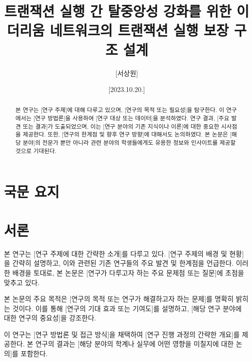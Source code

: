 \documentclass[a4paper,11pt]{article}
\title{트랜잭션 실행 간 탈중앙성 강화를 위한 이더리움 네트워크의 트랜잭션 실행 보장 구조 설계}
\author{[서상원]}
\date{[2023.10.20.]}
\begin{document}



\newpage 
{} %

\setcounter{page}{1}
\tableofcontents

\newpage
\clearpage %
\section*{\centering 국문 요지} %

\begin{abstract}
    본 연구는 [연구 주제]에 대해 다루고 있으며, [연구의 목적 또는 필요성]을 탐구한다. 
    이 연구에서는 [연구 방법론]을 사용하여 [연구 대상 또는 데이터]을 분석하였다. 
    연구 결과, [주요 발견 또는 결과]가 도출되었으며, 이는 [연구 분야의 기존 지식이나 이론]에 대한 중요한 시사점을 제공한다. 
    또한, [연구의 한계점 및 향후 연구 방향]에 대해서도 논의하였다. 
    본 논문은 [해당 분야]의 전문가 뿐만 아니라 관련 분야의 학생들에게도 유용한 정보와 인사이트를 제공할 것으로 기대된다.
\end{abstract}
\newpage
{} %

\listoffigures
\newpage
{} %
\setcounter{page}{1}

\section{서론}

본 연구는 [연구 주제에 대한 간략한 소개]를 다루고 있다. [연구 주제의 배경 및 현황]을 간략히 설명하고, 이와 관련된 기존 연구들의 주요 발견 및 한계점을 언급한다. 이러한 배경을 토대로, 본 논문은 [연구가 다루고자 하는 주요 문제점 또는 질문]에 초점을 맞추고 있다.

본 논문의 주요 목적은 [연구의 목적 또는 연구가 해결하고자 하는 문제]를 명확히 밝히는 것이다. 이를 통해 [연구의 기대 효과 또는 기여도]를 설명하고, [해당 연구 분야에 대한 연구의 중요성]을 강조한다.

이 연구는 [연구 방법론 및 접근 방식]을 채택하여 [연구 진행 과정의 간략한 개요]를 제공한다. 본 연구의 결과는 [해당 분야의 학계나 실무에 어떤 영향을 미칠지에 대한 논의]를 포함한다.
\end{document}
